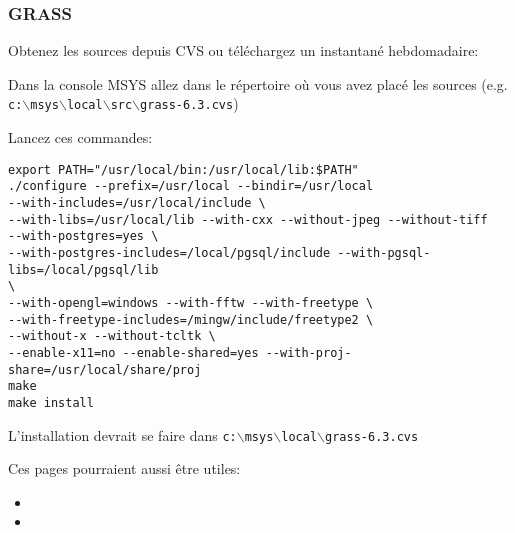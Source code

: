 \subsubsection{GRASS}
Obtenez les sources depuis CVS ou téléchargez un instantané hebdomadaire:

 \begin{quotation}
 \end{quotation}

Dans la console MSYS allez dans le répertoire où vous avez placé les sources (e.g. \texttt{c:$\backslash$msys$\backslash$local$\backslash$src$\backslash$grass-6.3.cvs})

Lancez ces commandes:

\begin{verbatim}
export PATH="/usr/local/bin:/usr/local/lib:$PATH"
./configure --prefix=/usr/local --bindir=/usr/local
--with-includes=/usr/local/include \
--with-libs=/usr/local/lib --with-cxx --without-jpeg --without-tiff
--with-postgres=yes \
--with-postgres-includes=/local/pgsql/include --with-pgsql-libs=/local/pgsql/lib
\
--with-opengl=windows --with-fftw --with-freetype \
--with-freetype-includes=/mingw/include/freetype2 \
--without-x --without-tcltk \
--enable-x11=no --enable-shared=yes --with-proj-share=/usr/local/share/proj
make
make install
\end{verbatim}

% 

L'installation devrait se faire dans \texttt{c:$\backslash$msys$\backslash$local$\backslash$grass-6.3.cvs}

Ces pages pourraient aussi être utiles:

\begin{itemize}
\item
{}
\item
{}
\end{itemize}


